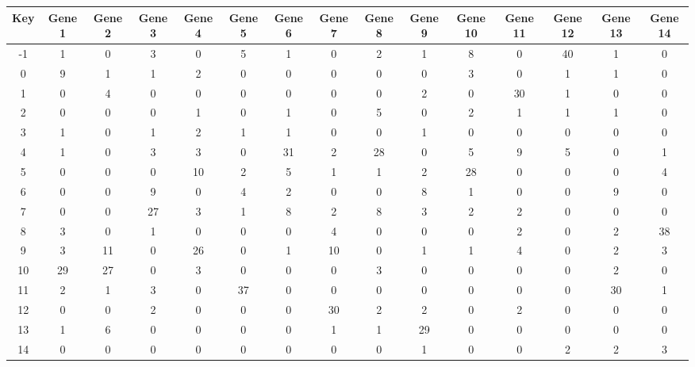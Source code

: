 \begin{tabular}{|c|c|c|c|c|c|c|c|c|c|c|c|c|c|c|}
\hline
Key & Gene 1 & Gene 2 & Gene 3 & Gene 4 & Gene 5 & Gene 6 & Gene 7 & Gene 8 & Gene 9 & Gene 10 & Gene 11 & Gene 12 & Gene 13 & Gene 14 \\
\hline
-1 & 1 & 0 & 3 & 0 & 5 & 1 & 0 & 2 & 1 & 8 & 0 & 40 & 1 & 0 \\
0 & 9 & 1 & 1 & 2 & 0 & 0 & 0 & 0 & 0 & 3 & 0 & 1 & 1 & 0 \\
1 & 0 & 4 & 0 & 0 & 0 & 0 & 0 & 0 & 2 & 0 & 30 & 1 & 0 & 0 \\
2 & 0 & 0 & 0 & 1 & 0 & 1 & 0 & 5 & 0 & 2 & 1 & 1 & 1 & 0 \\
3 & 1 & 0 & 1 & 2 & 1 & 1 & 0 & 0 & 1 & 0 & 0 & 0 & 0 & 0 \\
4 & 1 & 0 & 3 & 3 & 0 & 31 & 2 & 28 & 0 & 5 & 9 & 5 & 0 & 1 \\
5 & 0 & 0 & 0 & 10 & 2 & 5 & 1 & 1 & 2 & 28 & 0 & 0 & 0 & 4 \\
6 & 0 & 0 & 9 & 0 & 4 & 2 & 0 & 0 & 8 & 1 & 0 & 0 & 9 & 0 \\
7 & 0 & 0 & 27 & 3 & 1 & 8 & 2 & 8 & 3 & 2 & 2 & 0 & 0 & 0 \\
8 & 3 & 0 & 1 & 0 & 0 & 0 & 4 & 0 & 0 & 0 & 2 & 0 & 2 & 38 \\
9 & 3 & 11 & 0 & 26 & 0 & 1 & 10 & 0 & 1 & 1 & 4 & 0 & 2 & 3 \\
10 & 29 & 27 & 0 & 3 & 0 & 0 & 0 & 3 & 0 & 0 & 0 & 0 & 2 & 0 \\
11 & 2 & 1 & 3 & 0 & 37 & 0 & 0 & 0 & 0 & 0 & 0 & 0 & 30 & 1 \\
12 & 0 & 0 & 2 & 0 & 0 & 0 & 30 & 2 & 2 & 0 & 2 & 0 & 0 & 0 \\
13 & 1 & 6 & 0 & 0 & 0 & 0 & 1 & 1 & 29 & 0 & 0 & 0 & 0 & 0 \\
14 & 0 & 0 & 0 & 0 & 0 & 0 & 0 & 0 & 1 & 0 & 0 & 2 & 2 & 3 \\
\hline
\end{tabular}